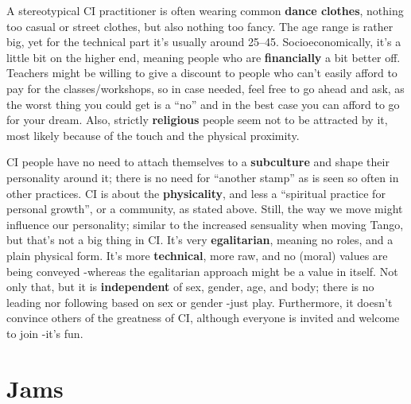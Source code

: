 A stereotypical CI practitioner is often wearing common \textbf{dance clothes}, nothing too casual or street clothes, but also nothing too fancy.
The age range is rather big, yet for the technical part it's usually around 25--45.
Socioeconomically, it's a little bit on the higher end, meaning people who are \textbf{financially} a bit better off.
Teachers might be willing to give a discount to people who can't easily afford to pay for the classes/workshops, so in case needed, feel free to go ahead and ask, as the worst thing you could get is a ``no'' and in the best case you can afford to go for your dream.
Also, strictly \textbf{religious} people seem not to be attracted by it, most likely because of the touch and the physical proximity.

CI people have no need to attach themselves to a \textbf{subculture} and shape their personality around it; there is no need for ``another stamp'' as is seen so often in other practices.
CI is about the \textbf{physicality}, and less a ``spiritual practice for personal growth'', or a community, as stated above.
Still, the way we move might influence our personality; similar to the increased sensuality when moving Tango, but that's not a big thing in CI\@.
It's very \textbf{egalitarian}, meaning no roles, and a plain physical form.
It's more \textbf{technical}, more raw, and no (moral) values are being conveyed -whereas the egalitarian approach might be a value in itself.
Not only that, but it is \textbf{independent} of sex, gender, age, and body; there is no leading nor following based on sex or gender -just play.
Furthermore, it doesn't convince others of the greatness of CI, although everyone is invited and welcome to join -it's fun.

\section{Jams}\label{sec:jams}

